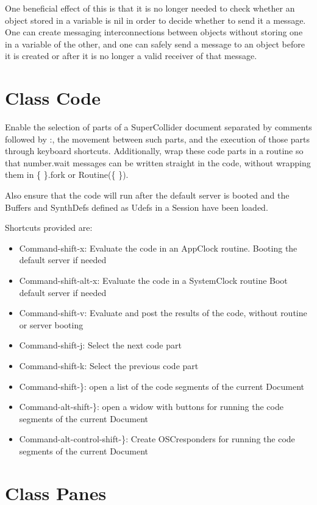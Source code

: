 \documentclass[11pt]{article}
\begin{document}
One beneficial effect of this is that it is no longer needed to check whether an object stored in a variable is nil in order to decide whether to send it a message. One can create messaging interconnections between objects without storing one in a variable of the other, and one can safely send a message to an object before it is created or after it is no longer a valid receiver of that message. 
\section{Class Code}
\label{sec-6}


Enable the selection of parts of a SuperCollider document separated by comments followed by :, the movement between such parts, and the execution of those parts through keyboard shortcuts. Additionally, wrap these code parts in a routine so that number.wait messages can be written straight in the code, without wrapping them in \{ \}.fork or Routine(\{ \}). 

Also ensure that the code will run after the default server is booted and the Buffers and SynthDefs defined as Udefs in a Session have been loaded. 

Shortcuts provided are:

\begin{itemize}
\item Command-shift-x: Evaluate the code in an AppClock routine. Booting the default server if needed
\item Command-shift-alt-x: Evaluate the code in a SystemClock routine Boot default server if needed
\item Command-shift-v: Evaluate and post the results of the code, without routine or server booting
\item Command-shift-j: Select the next code part
\item Command-shift-k: Select the previous code part
\item Command-shift-\}: open a list of the code segments of the current Document
\item Command-alt-shift-\}: open a widow with buttons for running the code segments of the current Document
\item Command-alt-control-shift-\}: Create OSCresponders for running the code segments of the current Document
\end{itemize}
\section{Class Panes}
\label{sec-7}
\end{document}
